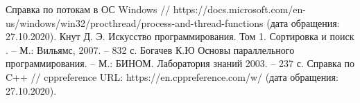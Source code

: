 \documentclass[12pt,a4paper]{article}
\numberwithin{equation}{section}
\begin{document}
\clearpage
\begin{thebibliography}{}
	 Справка по потокам в ОС Windows // https://docs.microsoft.com/en-us/windows/win32/procthread/process-and-thread-functions (дата обращения: 27.10.2020).
	 Кнут Д. Э. Искусство программирования. Том 1. Сортировка и поиск . -- М.: Вильямс, 2007. -- 832 с.
	 Богачев К.Ю Основы параллельного программирования. -- М.: БИНОМ. Лаборатория знаний 2003.  -- 237 с.
	 Справка по C++ // cppreference URL: https://en.cppreference.com/w/ (дата обращения: 27.10.2020).
\end{thebibliography}
\end{document}
